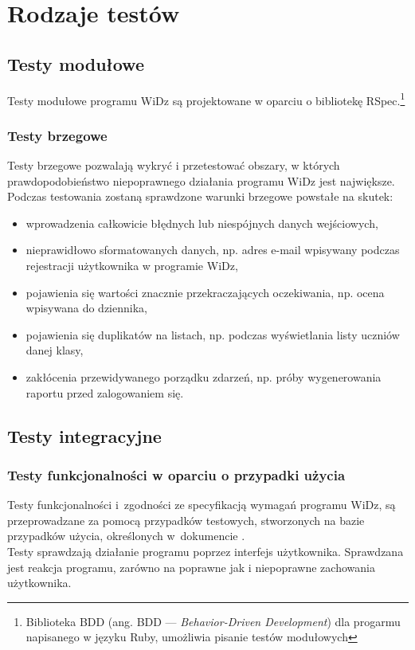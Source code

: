\documentclass[12pt,leqno,twoside]{mwart}
\begin{document}
\section{Rodzaje testów}
\subsection{Testy modułowe}
\noindent Testy modułowe programu WiDz są projektowane w oparciu o bibliotekę RSpec.\footnote{Biblioteka BDD (ang. BDD --- \textit{Behavior-Driven Development}) dla progarmu napisanego w języku Ruby, umożliwia pisanie testów modułowych} \\

\subsubsection{Testy brzegowe}
\noindent Testy brzegowe pozwalają wykryć i przetestować obszary, w których prawdopodobieństwo niepoprawnego działania programu WiDz jest największe. Podczas testowania zostaną sprawdzone warunki brzegowe powstałe na skutek: 
\begin{itemize}
	\item wprowadzenia całkowicie błędnych lub niespójnych danych wejściowych, 
	\item nieprawidłowo sformatowanych danych, np. adres e-mail wpisywany podczas rejestracji użytkownika w programie WiDz,
	\item pojawienia się wartości znacznie przekraczających oczekiwania, np. ocena wpisywana do dziennika,
	\item pojawienia się duplikatów na listach, np. podczas wyświetlania listy uczniów danej klasy,
	\item zakłócenia przewidywanego porządku zdarzeń, np. próby wygenerowania raportu przed zalogowaniem się.
\end{itemize} 
\subsection{Testy integracyjne}
\subsubsection{Testy funkcjonalności w oparciu o przypadki użycia}
\noindent Testy funkcjonalności i~zgodności ze specyfikacją wymagań programu WiDz, są przeprowadzane za pomocą przypadków testowych, stworzonych na bazie przypadków użycia, określonych w~dokumencie \cite{PU}. \\
\indent Testy sprawdzają działanie programu poprzez interfejs użytkownika. Sprawdzana jest reakcja programu, zarówno na poprawne jak i niepoprawne zachowania użytkownika. \\
\end{document}
